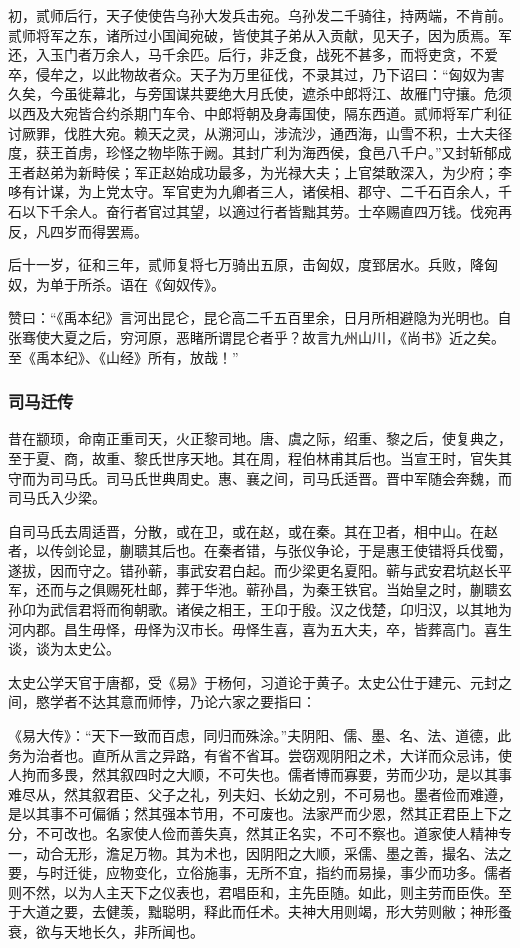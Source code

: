\documentclass[]{article}
\begin{document}
初，贰师后行，天子使使告乌孙大发兵击宛。乌孙发二千骑往，持两端，不肯前。贰师将军之东，诸所过小国闻宛破，皆使其子弟从入贡献，见天子，因为质焉。军还，入玉门者万余人，马千余匹。后行，非乏食，战死不甚多，而将吏贪，不爱卒，侵牟之，以此物故者众。天子为万里征伐，不录其过，乃下诏曰：``匈奴为害久矣，今虽徙幕北，与旁国谋共要绝大月氏使，遮杀中郎将江、故雁门守攘。危须以西及大宛皆合约杀期门车令、中郎将朝及身毒国使，隔东西道。贰师将军广利征讨厥罪，伐胜大宛。赖天之灵，从溯河山，涉流沙，通西海，山雪不积，士大夫径度，获王首虏，珍怪之物毕陈于阙。其封广利为海西侯，食邑八千户。''又封斩郁成王者赵弟为新畤侯；军正赵始成功最多，为光禄大夫；上官桀敢深入，为少府；李哆有计谋，为上党太守。军官吏为九卿者三人，诸侯相、郡守、二千石百余人，千石以下千余人。奋行者官过其望，以適过行者皆黜其劳。士卒赐直四万钱。伐宛再反，凡四岁而得罢焉。

后十一岁，征和三年，贰师复将七万骑出五原，击匈奴，度郅居水。兵败，降匈奴，为单于所杀。语在《匈奴传》。

赞曰：``《禹本纪》言河出昆仑，昆仑高二千五百里余，日月所相避隐为光明也。自张骞使大夏之后，穷河原，恶睹所谓昆仑者乎？故言九州山川，《尚书》近之矣。至《禹本纪》、《山经》所有，放哉！''

\hypertarget{header-n4749}{%
\subsubsection{司马迁传}\label{header-n4749}}

昔在颛顼，命南正重司天，火正黎司地。唐、虞之际，绍重、黎之后，使复典之，至于夏、商，故重、黎氏世序天地。其在周，程伯林甫其后也。当宣王时，官失其守而为司马氏。司马氏世典周史。惠、襄之间，司马氏适晋。晋中军随会奔魏，而司马氏入少梁。

自司马氏去周适晋，分散，或在卫，或在赵，或在秦。其在卫者，相中山。在赵者，以传剑论显，蒯聩其后也。在秦者错，与张仪争论，于是惠王使错将兵伐蜀，遂拔，因而守之。错孙蕲，事武安君白起。而少梁更名夏阳。蕲与武安君坑赵长平军，还而与之俱赐死杜邮，葬于华池。蕲孙昌，为秦王铁官。当始皇之时，蒯聩玄孙卬为武信君将而徇朝歌。诸侯之相王，王卬于殷。汉之伐楚，卬归汉，以其地为河内郡。昌生毋怿，毋怿为汉市长。毋怿生喜，喜为五大夫，卒，皆葬高门。喜生谈，谈为太史公。

太史公学天官于唐都，受《易》于杨何，习道论于黄子。太史公仕于建元、元封之间，愍学者不达其意而师悖，乃论六家之要指曰：

《易大传》：``天下一致而百虑，同归而殊涂。''夫阴阳、儒、墨、名、法、道德，此务为治者也。直所从言之异路，有省不省耳。尝窃观阴阳之术，大详而众忌讳，使人拘而多畏，然其叙四时之大顺，不可失也。儒者博而寡要，劳而少功，是以其事难尽从，然其叙君臣、父子之礼，列夫妇、长幼之别，不可易也。墨者俭而难遵，是以其事不可偏循；然其强本节用，不可废也。法家严而少恩，然其正君臣上下之分，不可改也。名家使人俭而善失真，然其正名实，不可不察也。道家使人精神专一，动合无形，澹足万物。其为术也，因阴阳之大顺，采儒、墨之善，撮名、法之要，与时迁徙，应物变化，立俗施事，无所不宜，指约而易操，事少而功多。儒者则不然，以为人主天下之仪表也，君唱臣和，主先臣随。如此，则主劳而臣佚。至于大道之要，去健羡，黜聪明，释此而任术。夫神大用则竭，形大劳则敝；神形蚤衰，欲与天地长久，非所闻也。
\end{document}
